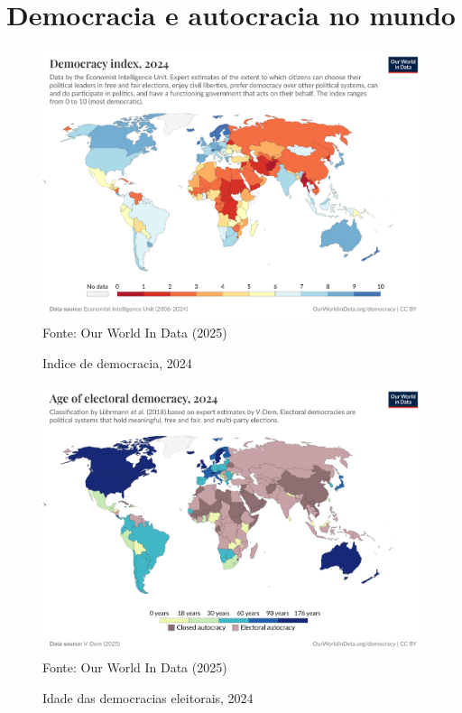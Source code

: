 \section{Democracia e autocracia no mundo}

\begin{figure}[ht]
    \centering
    \caption{Indice de democracia, 2024}
    \includegraphics[width=1\linewidth]{figuras/democracia/democracy-index-eiu.png}
    \label{fig:democracy-index-eiu}
    \footnotesize{Fonte: Our World In Data (2025)}
\end{figure}

\begin{figure}[ht]
    \centering
    \caption{Idade das democracias eleitorais, 2024}
    \includegraphics[width=1\linewidth]{figuras/democracia/age-of-electoral-democracy.png}
    \label{fig:age-of-electoral-democracy}
    \footnotesize{Fonte: Our World In Data (2025)}
\end{figure}


